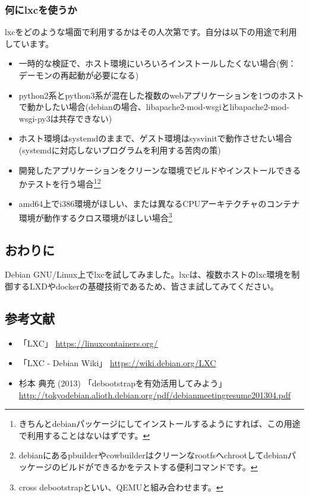 \documentclass[mingoth,a4paper]{jsarticle}
\begin{document}
\newpage

\subsubsection{何にlxcを使うか}

lxcをどのような場面で利用するかはその人次第です。自分は以下の用途で利用しています。

\begin{itemize}
\item 一時的な検証で、ホスト環境にいろいろインストールしたくない場合(例：デーモンの再起動が必要になる)
\item python2系とpython3系が混在した複数のwebアプリケーションを1つのホストで動かしたい場合(debianの場合、libapache2-mod-wsgiとlibapache2-mod-wsgi-py3は共存できない)
\item ホスト環境はsystemdのままで、ゲスト環境はsysvinitで動作させたい場合(systemdに対応しないプログラムを利用する苦肉の策)
\item 開発したアプリケーションをクリーンな環境でビルドやインストールできるかテストを行う場合\footnote{きちんとdebianパッケージにしてインストールするようにすれば、この用途で利用することはないはずです。}\footnote{debianにあるpbuilderやcowbuilderはクリーンなrootfsへchrootしてdebianパッケージのビルドができるかをテストする便利コマンドです。}
\item amd64上でi386環境がほしい、または異なるCPUアーキテクチャのコンテナ環境が動作するクロス環境がほしい場合\footnote{cross debootstrapといい、QEMUと組み合わせます。}
\end{itemize}


\subsection{おわりに}

Debian GNU/Linux上でlxcを試してみました。lxcは、複数ホストのlxc環境を制御するLXDやdockerの基礎技術であるため、皆さま試してみてください。


\subsection{参考文献}

\begin{itemize}
  \item 「LXC」 \url{https://linuxcontainers.org/}
  \item 「LXC - Debian Wiki」 \url{https://wiki.debian.org/LXC}
  \item 杉本 典充 (2013) 「debootstrapを有効活用してみよう」 \url{http://tokyodebian.alioth.debian.org/pdf/debianmeetingresume201304.pdf}
\end{itemize}
\end{document}
